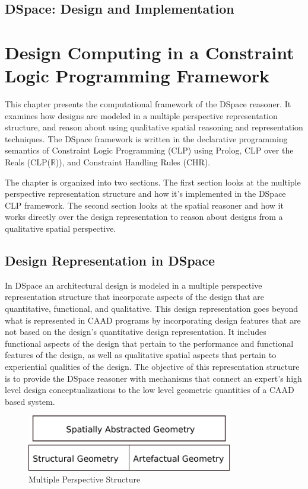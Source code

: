 \documentclass[12pt]{ucthesis}
\begin{document}
\section{DSpace: Design and Implementation}


\chapter{Design Computing in a Constraint Logic Programming Framework}
This chapter presents the computational framework of the DSpace reasoner. It examines how designs are modeled in a multiple perspective representation structure, and reason about using qualitative spatial reasoning and representation techniques. The DSpace framework is written in the declarative programming semantics of Constraint Logic Programming (CLP) using Prolog, CLP over the Reals (CLP($\mathbb{R}$)), and Constraint Handling Rules (CHR).  

The chapter is organized into two sections. The first section looks at the multiple perspective representation structure and how it's implemented in the DSpace CLP framework. The second section looks at the spatial reasoner and how it works directly over the design representation to reason about designs from a qualitative spatial perspective.

\section{Design Representation in DSpace}
In DSpace an architectural design is modeled in a multiple perspective representation structure that incorporate aspects of the design that are quantitative, functional, and qualitative. This design representation goes beyond what is represented in CAAD programs by incorporating design features that are not based on the design's quantitative design representation. It includes functional aspects of the design that pertain to the performance and functional features of the design, as well as qualitative spatial aspects that pertain to experiential qualities of the design. The objective of this representation structure is to provide the DSpace reasoner with mechanisms that connect an expert's high level design conceptualizations to the low level geometric quantities of a CAAD based system.   

\begin{figure}[H]
\centering
\includegraphics[width=90mm]{multi-persepective}
\caption{Multiple Perspective Structure}
\label{mutli-perspective}
\end{figure}
\end{document}
